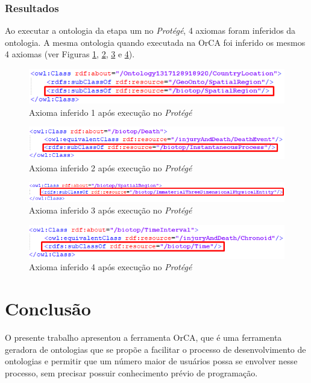 \documentclass{bcc}
\begin{document}
\subsection{Resultados}
Ao executar a ontologia da etapa um no \textit{Protégé}, 4 axiomas foram inferidos da ontologia. A mesma ontologia quando executada na OrCA foi inferido os mesmos 4 axiomas (ver Figuras \ref{fig:e3_axioma1}, \ref{fig:e3_axioma2}, \ref{fig:e3_axioma3} e \ref{fig:e3_axioma4}).

\begin{figure}[H]
\centering
\includegraphics[width=.7\textwidth]{Figuras/e3_axioma1.png}
\caption{Axioma inferido 1 após execução no \textit{Protégé}} 
\label{fig:e3_axioma1}
\end{figure}
\begin{figure}[H]
\centering
\includegraphics[width=.7\textwidth]{Figuras/e3_axioma2.png}
\caption{Axioma inferido 2 após execução no \textit{Protégé}} 
\label{fig:e3_axioma2}
\end{figure}
\begin{figure}[H]
\centering
\includegraphics[width=.8\textwidth]{Figuras/e3_axioma3.png}
\caption{Axioma inferido 3 após execução no \textit{Protégé}} 
\label{fig:e3_axioma3}
\end{figure}
\begin{figure}[H]
\centering
\includegraphics[width=.7\textwidth]{Figuras/e3_axioma4.png}
\caption{Axioma inferido 4 após execução no \textit{Protégé}} 
\label{fig:e3_axioma4}
\end{figure}

\chapter{Conclusão}
\label{chap:conclusao}

O presente trabalho apresentou a ferramenta OrCA, que é uma ferramenta geradora de ontologias que se propõe a facilitar o processo de desenvolvimento de ontologias e permitir que um número maior de usuários possa se envolver nesse processo, sem precisar possuir conhecimento prévio de programação. 
\end{document}
